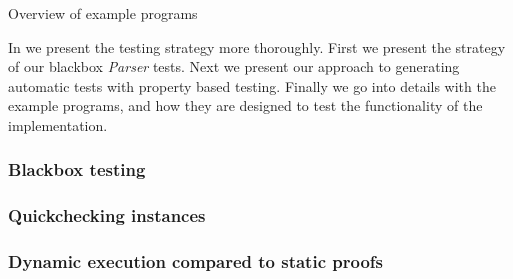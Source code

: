 \begin{table}

\caption{Overview of example programs}
\label{table:testprograms}
\end{table}

In  we present the testing strategy more thoroughly.
First we present the strategy of our blackbox \textit{Parser} tests. 
Next we present our approach to generating automatic tests with property based testing. 
Finally we go into details with the example programs, and how they are designed to test the functionality of the implementation.

\subsubsection{Blackbox testing}\label{sec:blackbox}


\subsubsection{Quickchecking instances}\label{sec:qc}


\subsubsection{Dynamic execution compared to static proofs}\label{sec:examples}


